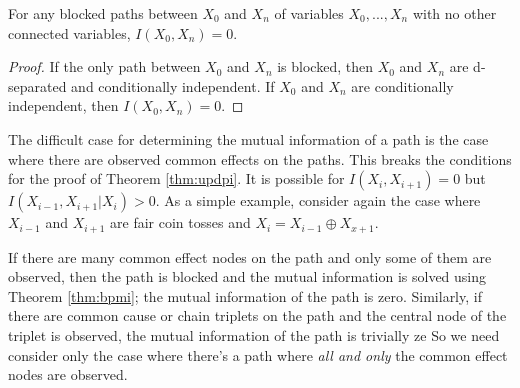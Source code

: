 \documentclass[../thesis.tex]{subfiles}
\begin{document}
\begin{thm}
  \label{thm:bpmi}
  For any blocked paths between $X_0$ and $X_n$
  of variables $X_0, ..., X_n$ with no other connected
  variables, $I(X_0,X_n) = 0$.
\end{thm}
\begin{proof}
  If the only path between $X_0$ and $X_n$ is blocked,
  then $X_0$ and $X_n$ are d-separated and 
  conditionally independent. If $X_0$ and $X_n$ are
  conditionally independent,
  then $I(X_0, X_n) = 0$.
\end{proof}

The difficult case for determining the mutual information
of a path is the case where there are observed common
effects on the paths.
This breaks the conditions for the proof of Theorem \ref{thm:updpi}.
It is possible for $I(X_i,X_{i+1}) = 0$ but
$I(X_{i-1},X_{i+1} \vert X_i) > 0$.
As a simple example, consider again the case where
$X_{i-1}$ and $X_{i+1}$ are fair coin tosses and
$X_i = X_{i-1} \oplus X_{x+1}$.

If there are many common effect nodes on the path and
only some of them are observed, then the path is
blocked and the mutual information is solved using
Theorem \ref{thm:bpmi}; the mutual information of the
path is zero.
Similarly, if there are common cause or chain triplets
on the path and the central node of the triplet is observed,
the mutual information of the path is trivially ze
So we need consider only the case where there's
a path where \emph{all and only} the common effect
nodes are observed.
\end{document}
